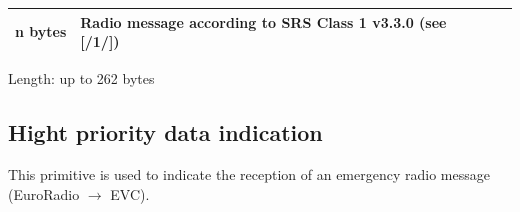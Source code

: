 \documentclass[nocc]{template/openetcs_report}
\begin{document}
\begin{longtable}{|l|l|l|}
				\hline
					 \begin{minipage}[t]{0.1\linewidth}n bytes \end{minipage}
					&\begin{minipage}[t]{0.6\linewidth}Radio message according to SRS Class 1 v3.3.0 (see [/1/])	\end{minipage}
					&\begin{minipage}[t]{0.3\linewidth}\end{minipage} \\
					
				\hline	
			\end{longtable}
			Length: up to 262 bytes
\subsection{Hight priority data indication}
This primitive is used to indicate the reception of an emergency radio message (EuroRadio $\rightarrow$ EVC).
\end{document}
